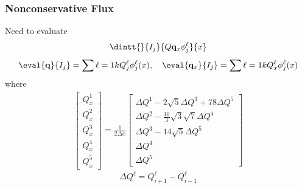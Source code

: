 \documentclass[10pt]{beamer}
\begin{document}
      \begin{frame}
        \frametitle{Nonconservative Flux}
        Need to evaluate
        \begin{gather*}
          \dintt{}{I_j}{Q \v{q}_x \phi^{\ell}_j}{x}
        \end{gather*}
        \[
          \eval{\v{q}}{I_j} = \sum{\ell = 1}{k}{Q_j^{\ell} \phi_j^{\ell}(x)}, \quad \eval{\v{q}_x}{I_j} = \sum{\ell = 1}{k}{Q_x^{\ell} \phi_j^{\ell}(x)}
        \]
        where
        \begin{gather*}
          \begin{bmatrix}
            Q_x^1 \\
            Q_x^2 \\
            Q_x^3 \\
            Q_x^4 \\
            Q_x^5
          \end{bmatrix}
          = \frac{1}{2\Delta x}
          \begin{bmatrix}
            \Delta Q^1 - 2\sqrt{5} \Delta Q^3 + 78 \Delta Q^5 \\
            \Delta Q^2 - \frac{10}{3} \sqrt{3} \sqrt{7} \Delta Q^4 \\
            \Delta Q^3 - 14 \sqrt{5} \Delta Q^5 \\
            \Delta Q^4 \\
            \Delta Q^5
          \end{bmatrix}
        \end{gather*}
        \[
          \Delta Q^{\ell} = Q_{i+1}^{\ell} - Q_{i-1}^{\ell}
        \]
      \end{frame}
\end{document}
